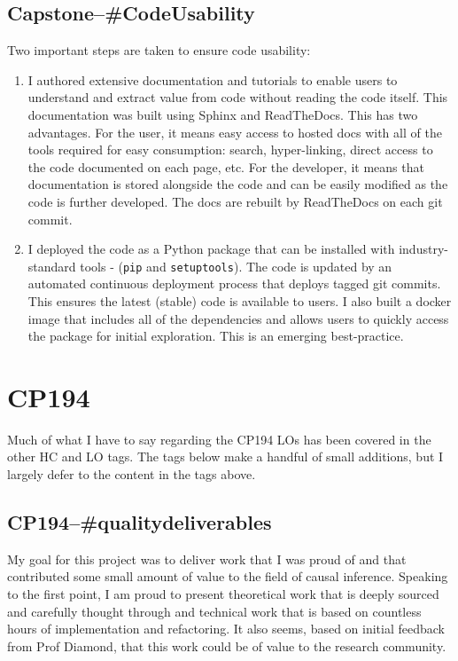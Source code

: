 \documentclass[../main.tex]{subfiles}
\begin{document}

\subsection*{\textbf{Capstone--\#CodeUsability}}
\label{lo:CodeUsability}

Two important steps are taken to ensure code usability:

\begin{enumerate}
    \item I authored extensive documentation and tutorials to enable users to understand and extract value from code without reading the code itself. This documentation was built using Sphinx and ReadTheDocs. This has two advantages. For the user, it means easy access to hosted docs with all of the tools required for easy consumption: search, hyper-linking, direct access to the code documented on each page, etc. For the developer, it means that documentation is stored alongside the code and can be easily modified as the code is further developed. The docs are rebuilt by ReadTheDocs on each git commit.
    
    \item I deployed the code as a Python package that can be installed with industry-standard tools - (\texttt{pip} and \texttt{setuptools}). The code is updated by an automated continuous deployment process that deploys tagged git commits. This ensures the latest (stable) code is available to users. I also built a docker image that includes all of the dependencies and allows users to quickly access the package for initial exploration. This is an emerging best-practice.
    
\end{enumerate}

\section{CP194}

Much of what I have to say regarding the CP194 LOs has been covered in the other HC and LO tags. The tags below make a handful of small additions, but I largely defer to the content in the tags above.

\subsection*{\textbf{CP194--\#qualitydeliverables}}

My goal for this project was to deliver work that I was proud of and that contributed some small amount of value to the field of causal inference. Speaking to the first point, I am proud to present theoretical work that is deeply sourced and carefully thought through and technical work that is based on countless hours of implementation and refactoring. It also seems, based on initial feedback from Prof Diamond, that this work could be of value to the research community.
\end{document}

